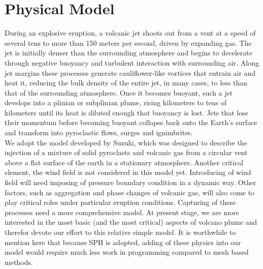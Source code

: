 \documentclass[10pt,a4paper]{article}
\begin{document}
\section{Physical Model} \label{sec:physics-model}
During an explosive eruption, a volcanic jet shoots out from a vent at a speed of several tens to more than 150 meters per second, driven by expanding gas. The jet is initially denser than the surrounding atmosphere and begins to decelerate through negative buoyancy and turbulent interaction with surrounding air. Along jet margins these processes generate cauliflower-like vortices that entrain air and heat it, reducing the bulk density of the entire jet, in many cases, to less than that of the surrounding atmosphere. Once it becomes buoyant, such a jet develops into a plinian or subplinian plume, rising kilometers to tens of kilometers until its heat is diluted enough that buoyancy is lost. Jets that lose their momentum before becoming buoyant collapse back onto the Earth’s surface and transform into pyroclastic flows, surges and ignimbrites.\\
We adopt the model developed by Suzuki\cite{suzuki2005numerical}, which was designed to describe the injection of a mixture of solid pyroclasts and volcanic gas from a circular vent above a flat surface of the earth in a stationary atmosphere. Another critical element, the wind field is not considered in this model yet. Introducing of wind field will need imposing of pressure boundary condition in a dynamic way. Other factors, such as aggregation and phase changes of volcanic gas, will also come to play critical roles under particular eruption conditions. Capturing of these processes need a more comprehensive model. At present stage, we are more interested in the most basic (and the most critical) aspects of volcano plume and therefor devote our effort to this relative simple model. It is worthwhile to mention here that because SPH is adopted, adding of these physics into our model would require much less work in programming compared to mesh based methods.
\end{document}
